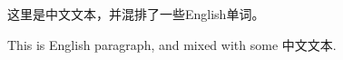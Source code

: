 \documentclass[a4paper,10pt]{article}
\begin{document}
	这里是中文文本，并混排了一些English单词。
	
	This is English paragraph, and mixed with some 中文文本.
	
\end{document}
